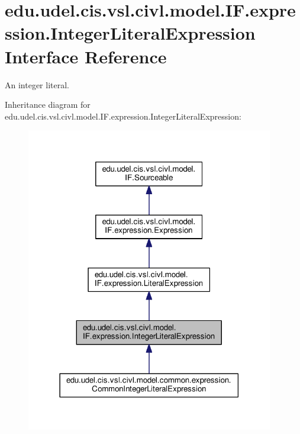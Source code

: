 \hypertarget{interfaceedu_1_1udel_1_1cis_1_1vsl_1_1civl_1_1model_1_1IF_1_1expression_1_1IntegerLiteralExpression}{}\section{edu.\+udel.\+cis.\+vsl.\+civl.\+model.\+I\+F.\+expression.\+Integer\+Literal\+Expression Interface Reference}
\label{interfaceedu_1_1udel_1_1cis_1_1vsl_1_1civl_1_1model_1_1IF_1_1expression_1_1IntegerLiteralExpression}


An integer literal.  




Inheritance diagram for edu.\+udel.\+cis.\+vsl.\+civl.\+model.\+I\+F.\+expression.\+Integer\+Literal\+Expression\+:
\nopagebreak
\begin{figure}[H]
\begin{center}
\leavevmode
\includegraphics[width=306pt]{interfaceedu_1_1udel_1_1cis_1_1vsl_1_1civl_1_1model_1_1IF_1_1expression_1_1IntegerLiteralExpression__inherit__graph}
\end{center}
\end{figure}


